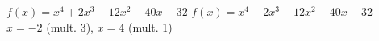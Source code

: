 {$f(x) = x^{4} + 2x^{3} - 12x^{2} - 40x - 32$}
{$f(x) = x^{4} + 2x^{3} - 12x^{2} - 40x - 32$ \\ $x = -2$ (mult. 3), $x = 4$ (mult. 1)}